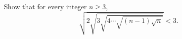 Show that for every integer $n \geq 3$,
\[
\sqrt{2\sqrt{3\sqrt{4\cdots\sqrt{(n-1)\sqrt{n}}}}} < 3.
\]
